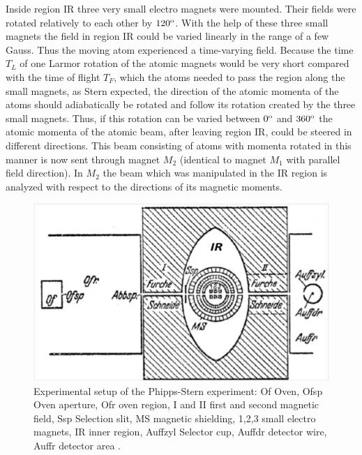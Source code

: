 \documentclass[12pt]{article}
\begin{document}
Inside region IR three very small electro magnets were mounted. Their fields were rotated relatively to each other by $120^{\rm o}$. With the help of these three small magnets the field in region IR could be varied linearly in the range of a few Gauss. Thus the moving atom experienced a time-varying field. Because the time $T_L$ of one Larmor rotation of the atomic magnets would be very short compared with the time of flight $T_F$, which the atoms needed to pass the region along the small magnets, as Stern expected, the direction of the atomic momenta of the atoms should adiabatically be rotated and follow its rotation created by the three small magnets. Thus, if this rotation can be varied between $0^{\rm o}$ and $360^{\rm o}$ the atomic momenta of the atomic beam, after leaving region IR, could be steered in different directions. This beam consisting of atoms with momenta rotated in this manner is now sent through magnet $M_2$ (identical to magnet $M_1$ with parallel field direction). In $M_2$ the beam which was manipulated in the IR region is analyzed with respect to the directions of its magnetic moments. 
%
\begin{figure}
\begin{center}
\includegraphics[scale=0.4]{figures/PhippsSternSetup}
\caption{Experimental setup of the Phipps-Stern experiment: Of Oven, Ofsp Oven aperture, Ofr oven region, I and II first and second magnetic field, Ssp Selection slit, MS magnetic shielding, 1,2,3 small electro magnets, IR inner region, Auffzyl Selector cup, Auffdr detector wire, Auffr detector area \cite[p.~189]{PhippsTEtal1932Einstellung}.}
\label{fig:PhippsSternSetup}
\end{center}
\end{figure}
\end{document}
